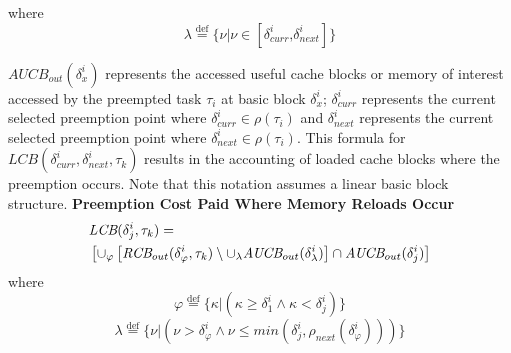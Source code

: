 \noindent
where
\begin{equation*}\label{eqn:lcb-formula-1b}
    \lambda \stackrel{\text{def}}{=} \{ \nu|\nu \in [ \delta_{curr}^{i} \text{,} \delta_{next}^{i} ] \}
\end{equation*}

\noindent
\begin{math}\textit{AUCB}_{out}(\delta_{x}^{i})\end{math} represents the accessed useful cache blocks or memory of interest accessed by the preempted task \begin{math}\tau_{i}\end{math} at basic block \begin{math}\delta_{x}^{i}\end{math}; \begin{math}\delta_{curr}^{i}\end{math} represents the current selected preemption point where \begin{math}\delta_{curr}^{i} \in \rho(\tau_{i})\end{math} and \begin{math}\delta_{next}^{i}\end{math} represents the current selected preemption point where \begin{math}\delta_{next}^{i} \in \rho(\tau_{i})\end{math}.  This formula for \begin{math}\textit{LCB}(\delta_{curr}^{i},\delta_{next}^{i},\tau_{k})\end{math} results in the accounting of loaded cache blocks where the preemption occurs.  Note that this notation assumes a linear basic block structure.
\newline
\newline
\noindent\textbf{Preemption Cost Paid Where Memory Reloads Occur}
\begin{equation}\label{eqn:lcb-formula-2}
\begin{split}
    \lefteqn{\textit{LCB}(\delta_{j}^{i},\tau_{k}) =} & \\
    &\left[\cup_\varphi \left[\textit{RCB}_{out}(\delta_{\varphi}^{i},\tau_{k}) \setminus \cup_\lambda \textit{AUCB}_{out}(\delta_{\lambda}^{i})\right] \cap \textit{AUCB}_{out}(\delta_{j}^{i})\right]\\
\end{split}
\end{equation}
\noindent
where
\begin{equation*}\label{eqn:lcb-formula-2b}
\varphi \stackrel{\text{def}}{=} \{\kappa | (\kappa \geq \delta_{1}^{i} \wedge \kappa < \delta_{j}^{i})\}
\end{equation*}
\begin{equation*}\label{eqn:lcb-formula-2c}
    \lambda \stackrel{\text{def}}{=} \{\nu | (\nu > \delta_{\varphi}^{i} \wedge \nu \leq min(\delta_{j}^{i},\rho_{next}(\delta_{\varphi}^{i})))\}
\end{equation*}

